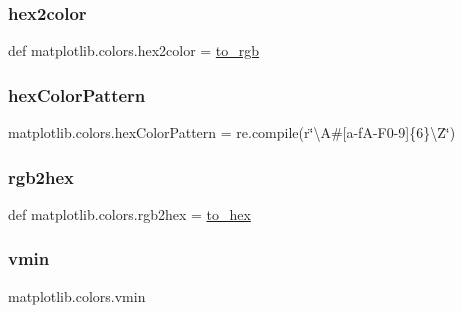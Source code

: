 \subsubsection{\texorpdfstring{hex2color}{hex2color}}
{\footnotesize\ttfamily def matplotlib.\+colors.\+hex2color = \hyperlink{namespacematplotlib_1_1colors_a131bb01614d6474f3031c00026bd93ec}{to\+\_\+rgb}}

\mbox{\label{namespacematplotlib_1_1colors_af26cd70a131ac31abe1aa77acf04c3d7}} 
\subsubsection{\texorpdfstring{hex\+Color\+Pattern}{hexColorPattern}}
{\footnotesize\ttfamily matplotlib.\+colors.\+hex\+Color\+Pattern = re.\+compile(r\char`\"{}\textbackslash{}A\#\mbox{[}a-\/fA-\/F0-\/9\mbox{]}\{6\}\textbackslash{}Z\char`\"{})}

\mbox{\label{namespacematplotlib_1_1colors_ac1f1c87b31eac3797245a61b5222aa7d}} 
\subsubsection{\texorpdfstring{rgb2hex}{rgb2hex}}
{\footnotesize\ttfamily def matplotlib.\+colors.\+rgb2hex = \hyperlink{namespacematplotlib_1_1colors_a7ddf4279539e8252678d727599925336}{to\+\_\+hex}}

\mbox{\label{namespacematplotlib_1_1colors_a64fab219e2255adac7821722f85263bf}} 
\subsubsection{\texorpdfstring{vmin}{vmin}}
{\footnotesize\ttfamily matplotlib.\+colors.\+vmin}


